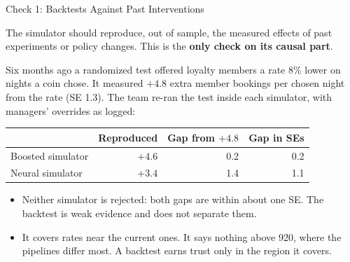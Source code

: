\documentclass[aspectratio=169, 11pt, handout]{beamer}
\begin{document}
\begin{frame}{Check 1: Backtests Against Past Interventions}

The simulator should reproduce, out of sample, the measured effects of past experiments or policy changes. This is the \textbf{only check on its causal part}.

\bigskip

Six months ago a randomized test offered loyalty members a rate 8\% lower on nights a coin chose. It measured $+4.8$ extra member bookings per chosen night from the rate (SE 1.3). The team re-ran the test inside each simulator, with managers' overrides as logged:

\begin{center}
\begin{tabular}{lrrr}
\toprule
& \textbf{Reproduced} & \textbf{Gap from $+4.8$} & \textbf{Gap in SEs} \\
\midrule
Boosted simulator & $+4.6$ & 0.2 & 0.2 \\
Neural simulator & $+3.4$ & 1.4 & 1.1 \\
\bottomrule
\end{tabular}
\end{center}

\medskip

\begin{itemize}
  \item Neither simulator is rejected: both gaps are within about one SE. The backtest is weak evidence and does not separate them.
  \item It covers rates near the current ones. It says nothing above 920, where the pipelines differ most. A backtest earns trust only in the region it covers.
\end{itemize}
\end{frame}
\end{document}
